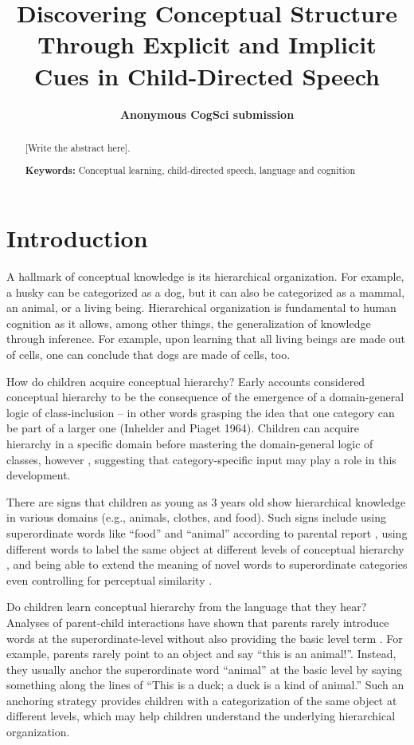 \documentclass[10pt, letterpaper]{article}
\title{Discovering Conceptual Structure Through Explicit and Implicit Cues in
Child-Directed Speech}
\author{{\large \bf Anonymous CogSci submission}}
\begin{document}
\maketitle

\begin{abstract}
{[}Write the abstract here{]}.

\textbf{Keywords:}
Conceptual learning, child-directed speech, language and cognition
\end{abstract}

\hypertarget{introduction}{%
\section{Introduction}\label{introduction}}

A hallmark of conceptual knowledge is its hierarchical organization. For
example, a husky can be categorized as a dog, but it can also be
categorized as a mammal, an animal, or a living being. Hierarchical
organization is fundamental to human cognition as it allows, among other
things, the generalization of knowledge through inference. For example,
upon learning that all living beings are made out of cells, one can
conclude that dogs are made of cells, too.

How do children acquire conceptual hierarchy? Early accounts considered
conceptual hierarchy to be the consequence of the emergence of a
domain-general logic of class-inclusion -- in other words grasping the idea that one category can be part of a larger one
(Inhelder and Piaget 1964). Children can acquire hierarchy in a specific domain before mastering the domain-general logic of classes, however \cite{chi1989,carey1985,inagaki2002,keil1981},
suggesting that category-specific input may play a role in this development.

There are signs that children as young as 3 years old show hierarchical
knowledge in various domains (e.g., animals, clothes, and food). Such
signs include using superordinate words like ``food'' and ``animal''
according to parental report \cite{fenson1994}, using different
words to label the same object at different levels of conceptual
hierarchy \cite{waxman1992,clark1997},
and being able to
extend the meaning of novel words to superordinate categories even
controlling for perceptual similarity \cite{liu2001}.

Do children learn conceptual hierarchy from the language that they hear? Analyses of parent-child
interactions have shown that parents rarely introduce words at the
superordinate-level without also providing the basic level term \cite{blewitt1983,shipley1983,callanan1985}.
For example,
parents rarely point to an object and say ``this is an animal!''.
Instead, they usually anchor the superordinate word ``animal'' at the
basic level by saying something along the lines of ``This is a duck; a
duck is a kind of animal.'' Such an anchoring strategy provides children
with a categorization of the same object at different levels, which may
help children understand the underlying hierarchical organization.
\end{document}
